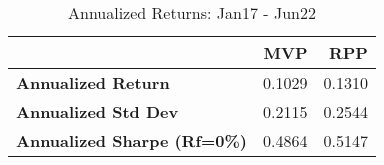 \begin{table}
	\centering
	\begingroup
	\fontsize{9}{9}
	\selectfont
	\begin{tabular}{>{}lrr}
		\toprule
		                                    & MVP    & RPP    \\
		\midrule
		\textbf{Annualized Return}          & 0.1029 & 0.1310 \\
		\textbf{Annualized Std Dev}         & 0.2115 & 0.2544 \\
		\textbf{Annualized Sharpe (Rf=0\%)} & 0.4864 & 0.5147 \\
		\bottomrule
	\end{tabular} \caption{Annualized Returns: Jan17 - Jun22}
	\label{tab: HighLow }
	\endgroup{}
\end{table}